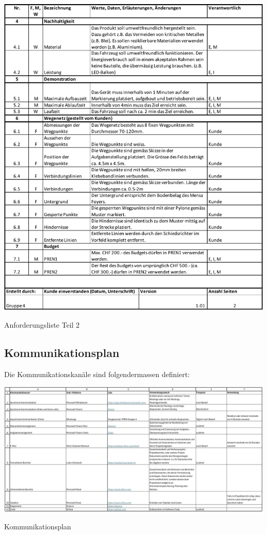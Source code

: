 \begin{table}[H]
\centering
\includegraphics[width=\textwidth]{assets/Anforderungsliste_V1.01_page2.pdf}
\caption{Anforderungsliste Teil 2}
\label{table:anforderungsliste_page2}
\end{table}
\newpage

\begin{landscape}
\subsection{Kommunikationsplan}\label{kommunikationsplan}
Die Kommunikationskanäle sind folgendermassen definiert:

\begin{table}[H]
\centering
\includegraphics[width=240mm]{assets/Kommunikationschnittstellen.pdf}
\caption{Kommunikationsplan}
\label{table:communications-plan}
\end{table}
\end{landscape}


